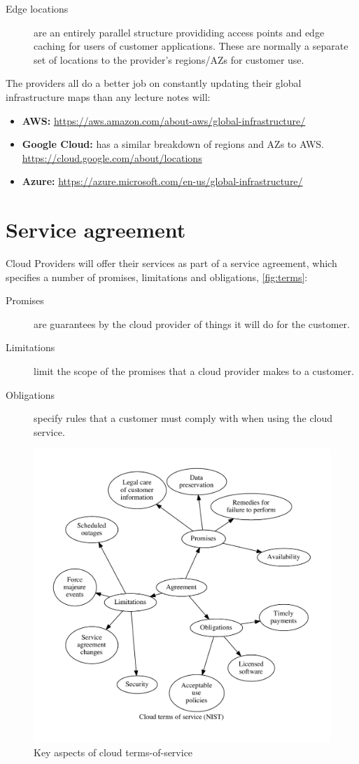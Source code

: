 \documentclass{pgnotes}
\begin{document}
\begin{description}
\item[Edge locations] are an entirely parallel structure provididing access points and edge caching for users of customer applications.
  These are normally a separate set of locations to the provider's regions/AZs for customer use.

\end{description}

The providers all do a better job on constantly updating their global infrastructure maps than any lecture notes will:
\begin{itemize}
\item \textbf{AWS:} \url{https://aws.amazon.com/about-aws/global-infrastructure/}
\item \textbf{Google Cloud:} has a similar breakdown of regions and AZs to AWS. \url{https://cloud.google.com/about/locations}
\item \textbf{Azure:} \url{https://azure.microsoft.com/en-us/global-infrastructure/}
\end{itemize}

\section{Service agreement}

Cloud Providers will offer their services as part of a service agreement, which specifies a number of promises, limitations and obligations, \autoref{fig:terms}:
\begin{description}
\item[Promises] are guarantees by the cloud provider of things it will do for the customer.
\item[Limitations] limit the scope of the promises that a cloud provider makes to a customer.
\item[Obligations] specify rules that a customer must comply with when using the cloud service. 
\end{description}

\begin{figure}[htbp]
  \centering
  \includegraphics[width=0.75\linewidth]{terms_map}
  \caption{Key aspects of cloud terms-of-service}
  \label{fig:terms}
\end{figure}
\end{document}
